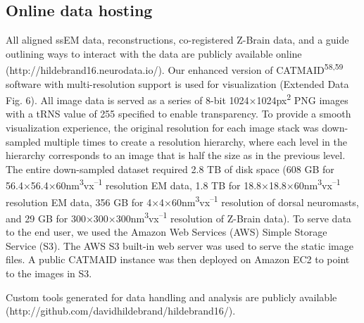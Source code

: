 \documentclass{article}
\begin{document}
\subsection*{Online data hosting}

All aligned ssEM data, reconstructions, co-registered Z-Brain data, and a guide outlining ways to interact with the data are publicly available online (http://hildebrand16.neurodata.io/). Our enhanced version of CATMAID\textsuperscript{58,59} software with multi-resolution support is used for visualization (Extended Data Fig. 6). All image data is served as a series of 8-bit 1024×1024px\textsuperscript{2} PNG images with a tRNS value of 255 specified to enable transparency. To provide a smooth visualization experience, the original resolution for each image stack was down-sampled multiple times to create a resolution hierarchy, where each level in the hierarchy corresponds to an image that is half the size as in the previous level. The entire down-sampled dataset required 2.8 TB of disk space (608 GB for 56.4×56.4×60nm\textsuperscript{3}vx\textsuperscript{–1} resolution EM data, 1.8 TB for 18.8×18.8×60nm\textsuperscript{3}vx\textsuperscript{–1} resolution EM data, 356 GB for 4×4×60nm\textsuperscript{3}vx\textsuperscript{–1} resolution of dorsal neuromasts, and 29 GB for 300×300×300nm\textsuperscript{3}vx\textsuperscript{–1} resolution of Z-Brain data). To serve data to the end user, we used the Amazon Web Services (AWS) Simple Storage Service (S3). The AWS
S3 built-in web server was used to serve the static image files. A public CATMAID instance was then deployed on Amazon EC2 to point to the images in S3.

Custom tools generated for data handling and analysis are publicly available (http://github.com/davidhildebrand/hildebrand16/).


\end{document}

